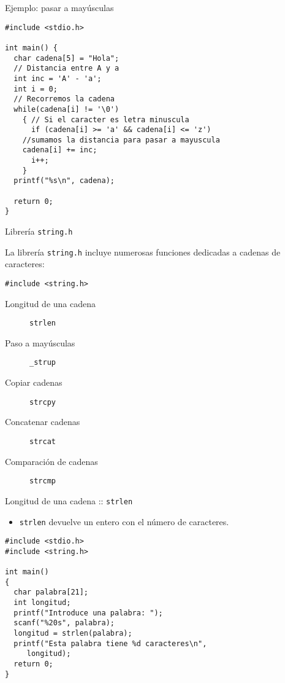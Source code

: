 \documentclass[xcolor={usenames,svgnames,dvipsnames}, aspectratio=169]{beamer}
\begin{document}
\begin{frame}[label={sec:orgd9f8e2e},fragile,plain]{Ejemplo: pasar a mayúsculas}
 \lstset{language=C,label= ,caption= ,captionpos=b,numbers=none}
\begin{lstlisting}
#include <stdio.h>

int main() {
  char cadena[5] = "Hola";
  // Distancia entre A y a
  int inc = 'A' - 'a';
  int i = 0;
  // Recorremos la cadena
  while(cadena[i] != '\0')
    { // Si el caracter es letra minuscula
      if (cadena[i] >= 'a' && cadena[i] <= 'z')
	//sumamos la distancia para pasar a mayuscula
	cadena[i] += inc;
      i++;
    }
  printf("%s\n", cadena);

  return 0;
}
\end{lstlisting}
\end{frame}
\begin{frame}[label={sec:org96b33f6},fragile]{Librería \texttt{string.h}}
 \begin{block}{}
La librería \texttt{string.h} incluye numerosas funciones dedicadas a cadenas de caracteres:

\lstset{language=C,label= ,caption= ,captionpos=b,numbers=none}
\begin{lstlisting}
#include <string.h>
\end{lstlisting}

\begin{description}
\item[{Longitud de una cadena}] \texttt{strlen}
\item[{Paso a mayúsculas}] \texttt{\_strup}
\item[{Copiar cadenas}] \texttt{strcpy}
\item[{Concatenar cadenas}] \texttt{strcat}
\item[{Comparación de cadenas}] \texttt{strcmp}
\end{description}
\end{block}
\end{frame}

\begin{frame}[label={sec:org292eb38},fragile]{Longitud de una cadena :: \texttt{strlen}}
 \begin{itemize}
\item \texttt{strlen} devuelve un entero con el número de caracteres.
\end{itemize}
\lstset{language=C,label= ,caption= ,captionpos=b,numbers=none}
\begin{lstlisting}
#include <stdio.h>
#include <string.h>

int main()
{
  char palabra[21];
  int longitud;
  printf("Introduce una palabra: ");
  scanf("%20s", palabra);
  longitud = strlen(palabra);
  printf("Esta palabra tiene %d caracteres\n",
	 longitud);
  return 0;
}
\end{lstlisting}
\end{frame}
\end{document}
